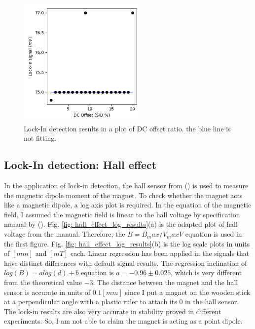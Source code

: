 \documentclass{article}
\begin{document}
\begin{figure}[H]
  \centering
  \includegraphics[width=6.3cm]{../results/lock_in_dc_stability.png}
  \caption{Lock-In detection results in a plot of DC offset ratio. the blue line is not fitting.
  }
  \label{fig: dc_offset_results}
\end{figure}


\subsection{Lock-In detection: Hall effect}
In the application of lock-in detection, the hall sensor from (\cite{hall_sensor}) is used to measure the magnetic dipole moment of the magnet.
To check whether the magnet acts like a magnetic dipole, a log axis plot is required.
In the equation of the magnetic field, I assumed the magnetic field is linear to the hall voltage by specification manual by (\cite{hall_sensor}).
Fig. \ref{fig: hall_effect_log_results}(a) is the adapted plot of hall voltage from the manual.
Therefore, the $B = B_max /V_max V$ equation is used in the first figure.
Fig. \ref{fig: hall_effect_log_results}(b) is the log scale plots in units of $[mm]$ and $[mT]$ each.
Linear regression has been applied in the signals that have distinct differences with default signal results.
The regression inclination of $log (B) = a log (d) + b$ equation is $a=-0.96 \pm 0.025$, which is very different from the theoretical value $-3$.
The distance between the magnet and the hall sensor is accurate in units of $0.1 [mm]$ since I put a magnet on the wooden stick at a perpendicular angle with a plastic ruler to attach its $0$ in the hall sensor.
The lock-in results are also very accurate in stability proved in different experiments.
So, I am not able to claim the magnet is acting as a point dipole.
\end{document}
